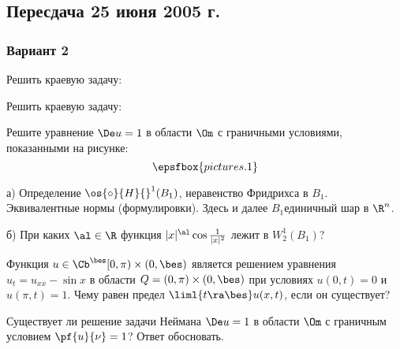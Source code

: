 \documentclass[a4paper]{article}
\begin{document}
\subsection{Пересдача 25 июня 2005 г.}

\subsubsection{Вариант 2}
\setcounter{problem}{0}

\begin{problem}
Решить краевую задачу:
\end{problem}

\begin{problem}
Решить краевую задачу:
\end{problem}

\begin{problem}
Решите уравнение $\De u = 1$ в области $\Om$ с граничными условиями, показанными на рисунке:
$$\epsfbox{pictures.1}$$
\end{problem}

\begin{problem}

а) Определение $\os{\circ}{H}{}^1(B_1)$, неравенство Фридрихса в $B_1$. Эквивалентные нормы (формулировки).
Здесь и далее $B_1$\т единичный шар в $\R^n$.

б) При каких $\al \in \R$ функция $|x|^\al \cos\frac{1}{|x|^2}$ лежит в $W_2^1(B_1)$?
\end{problem}

\begin{problem}
Функция $u \in \Cb^\bes[0,\pi)\times (0,\bes)$ является решением уравнения $u_t = u_{xx} - \sin x$
в области $Q = (0,\pi) \times (0,\bes)$ при условиях $u(0,t) = 0$ и $u(\pi,t) = 1$.
Чему равен предел $\liml{t \ra \bes} u(x,t)$, если он существует?
\end{problem}

\begin{problem}
Существует ли решение задачи Неймана $\De u = 1$ в области $\Om$ с граничным условием $\pf{u}{\nu} = 1$?
Ответ обосновать.
\end{problem}


\medskip\dmvntrail
\end{document}
